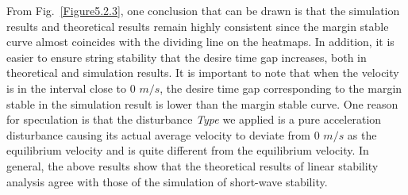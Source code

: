 \documentclass[journal]{IEEEtran}
\begin{document}
From Fig.~\ref{Figure5.2.3}, one conclusion that can be drawn is that the simulation results and theoretical results remain highly consistent since the margin stable curve almost coincides with the dividing line on the heatmaps. In addition, it is easier to ensure string stability that the desire time gap increases, both in theoretical and simulation results. It is important to note that when the velocity is in the interval close to 0 $m/s$, the desire time gap corresponding to the margin stable in the simulation result is lower than the margin stable curve. One reason for speculation is that the disturbance \textit{Type \uppercase\expandafter{}} we applied is a pure acceleration disturbance causing its actual average velocity to deviate from 0 $m/s$ as the equilibrium velocity and is quite different from the equilibrium velocity. In general, the above results show that the theoretical results of linear stability analysis agree with those of the simulation of short-wave stability.









\end{document}
